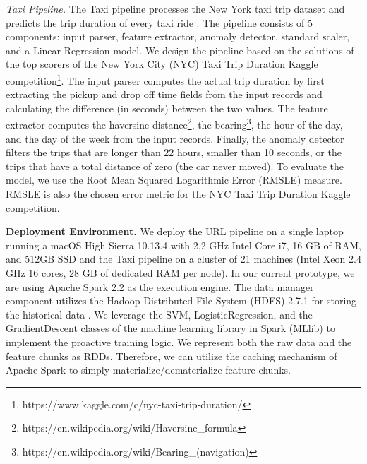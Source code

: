 \textit{Taxi Pipeline.} The Taxi pipeline processes the New York taxi trip dataset and predicts the trip duration of every taxi ride \cite{newyork-taxi}. 
The pipeline consists of 5 components: input parser, feature extractor, anomaly detector, standard scaler, and a Linear Regression model.
We design the pipeline based on the solutions of the top scorers of the New York City (NYC) Taxi Trip Duration Kaggle competition\footnote{https://www.kaggle.com/c/nyc-taxi-trip-duration/}. 
The input parser computes the actual trip duration by first extracting the pickup and drop off time fields from the input records and calculating the difference (in seconds) between the two values.
The feature extractor computes the haversine distance\footnote{https://en.wikipedia.org/wiki/Haversine\_formula}, the bearing\footnote{https://en.wikipedia.org/wiki/Bearing\_(navigation)}, the hour of the day, and the day of the week from the input records. 
Finally, the anomaly detector filters the trips that are longer than 22 hours, smaller than 10 seconds, or the trips that have a total distance of zero (the car never moved).
To evaluate the model, we use the Root Mean Squared Logarithmic Error (RMSLE) measure.
RMSLE is also the chosen error metric for the NYC Taxi Trip Duration Kaggle competition.

\textbf{Deployment Environment. }
We deploy the URL pipeline on a single laptop running a macOS High Sierra 10.13.4 with 2,2 GHz Intel Core i7, 16 GB of RAM, and 512GB SSD and the Taxi pipeline on a cluster of 21 machines (Intel Xeon 2.4 GHz 16 cores, 28 GB of dedicated RAM per node).
In our current prototype, we are using Apache Spark 2.2 as the execution engine.
The data manager component utilizes the Hadoop Distributed File System (HDFS) 2.7.1 for storing the historical data \cite{shvachko2010hadoop}.
We leverage the SVM, LogisticRegression, and the GradientDescent classes of the machine learning library in Spark (MLlib) to implement the proactive training logic.
We represent both the raw data and the feature chunks as RDDs.
Therefore, we can utilize the caching mechanism of Apache Spark to simply materialize/dematerialize feature chunks.

